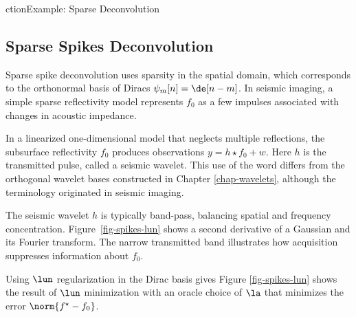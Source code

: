 ction{Example: Sparse Deconvolution}


                                                                
\subsection{Sparse Spikes Deconvolution}

Sparse spike deconvolution uses sparsity in the spatial domain, which corresponds to the orthonormal basis of Diracs $\psi_m[n] = \de[n-m]$. In seismic imaging, a simple sparse reflectivity model represents $f_0$ as a few impulses associated with changes in acoustic impedance.

In a linearized one-dimensional model that neglects multiple reflections, the subsurface reflectivity $f_0$ produces observations $y=h \star f_0 + w$. Here $h$ is the transmitted pulse, called a seismic wavelet. This use of the word differs from the orthogonal wavelet bases constructed in Chapter \ref{chap-wavelets}, although the terminology originated in seismic imaging.

The seismic wavelet $h$ is typically band-pass, balancing spatial and frequency concentration. Figure~\ref{fig-spikes-lun} shows a second derivative of a Gaussian and its Fourier transform. The narrow transmitted band illustrates how acquisition suppresses information about $f_0$.

            
                                  
      
                       
                     

Using $\lun$ regularization in the Dirac basis gives
Figure \ref{fig-spikes-lun} shows the result of $\lun$ minimization with an oracle choice of $\la$ that minimizes the error $\norm{f^\star-f_0}$.



